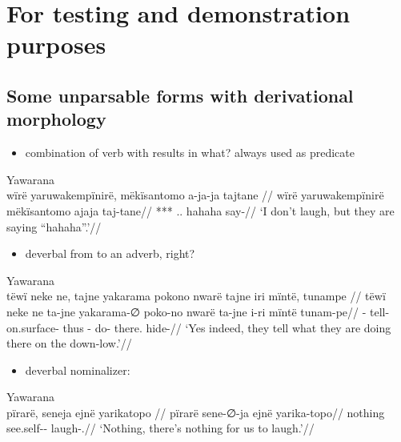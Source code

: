 \documentclass{memoir}
\begin{document}
\chapter{For testing and demonstration purposes}

\section{Some unparsable forms with derivational morphology}

\begin{itemize}
\tightlist
\item
  combination of verb with  results in what? always used
  as predicate
\end{itemize}

\ex Yawarana \\
\label{convrisamaj-07}    \begingl
    \glpreamble  wïrë yaruwakempïnirë, mëkïsantomo a-ja-ja tajtane //
    \gla wïrë yaruwakempïnirë mëkïsantomo ajaja taj-tane//
    \glb {} *** .. hahaha say-//
        \glft ‘I don’t laugh, but they are saying “hahaha”.’//  
    \endgl 
\xe

\begin{itemize}
\tightlist
\item
  deverbal from  to an adverb, right?
\end{itemize}

\ex Yawarana \\
\label{convrisamaj-09}    \begingl
    \glpreamble  tëwï neke ne, tajne yakarama pokono nwarë tajne iri mïntë, tunampe //
    \gla tëwï neke ne ta-jne yakarama-∅ poko-no nwarë ta-jne i-ri mïntë tunam-pe//
    \glb {}   - tell- on.surface- thus - do- there. hide-//
        \glft ‘Yes indeed, they tell what they are doing there on the down-low.’//  
    \endgl 
\xe

\begin{itemize}
\tightlist
\item
  deverbal nominalizer:
\end{itemize}

\ex Yawarana \\
\label{convrisamaj-13}    \begingl
    \glpreamble  pïrarë, seneja ejnë yarikatopo //
    \gla pïrarë sene-∅-ja ejnë yarika-topo//
    \glb nothing see.self--  laugh-.//
        \glft ‘Nothing, there’s nothing for us to laugh.’//  
    \endgl 
\xe
\end{document}
